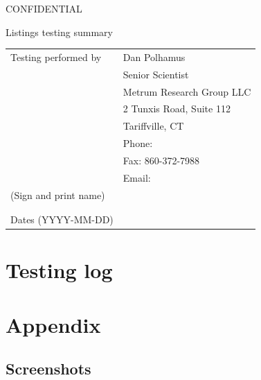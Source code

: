 \documentclass{article}
\newcommand{\topic}{Listings testing summary}
\newcommand{\testinglog}{listings-testing-log-complete.pdf}
\begin{document}
\vspace*{1cm}
\begin{center}
{\large CONFIDENTIAL}


\vspace*{1cm}


\vspace*{1cm}

{\Large \topic}
\vspace{3.0cm}
\end{center}

\newpage
\vspace*{1cm}
\begin{center}
\vspace{3.0cm}

\begin{tabular}{|l|l|}\hline
Testing performed by &   Dan Polhamus\\
                      &  Senior Scientist \\
                      &  Metrum Research Group LLC \\
                      &  2 Tunxis Road, Suite 112\\
                      &  Tariffville, CT\\
                      &  Phone:  \\
                      &  Fax: 860-372-7988 \\
                      &  Email:  \\\hline
 (Sign and print name) & \\
                       & \\
                       & \\\hline
Dates (YYYY-MM-DD)     &               \\\hline



\end{tabular}

\end{center}

\newpage

\section*{Testing log}



\newpage


\section*{Appendix}

\subsection*{Screenshots}




\end{document}

